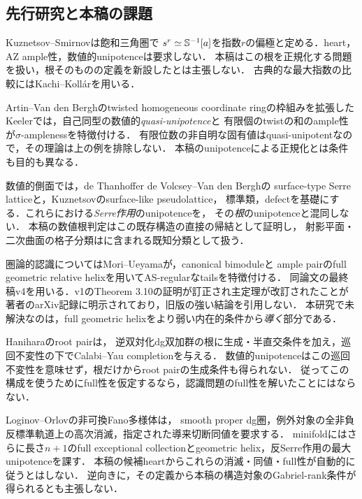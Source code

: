 \documentclass[11pt,a4paper]{ltjsarticle}
\begin{document}
\subsection{先行研究と本稿の課題}\label{subsec:literature}
Kuznetsov--Smirnov\cite[Definition 2.1, Example 2.2]{KS}は飽和三角圏で
$s^r\simeq\mathbb S^{-1}[a]$を指数$r$の偏極と定める．heart，AZ ample性，数値的unipotenceは要求しない．
本稿はこの根を正規化する問題を扱い，根そのものの定義を新設したとは主張しない．
古典的な最大指数の比較にはKachi--Koll\'ar\cite[Corollary 2(1)]{KK}を用いる．

Artin--Van den Berghのtwisted homogeneous coordinate ringの枠組みを拡張した
Keeler\cite[Theorems 1.2, 1.3]{Keeler}では，自己同型の数値的\emph{quasi-unipotence}と
有限個のtwistの和のample性が$\sigma$-amplenessを特徴付ける．
有限位数の非自明な固有値はquasi-unipotentなので，その理論は上の例を排除しない．
本稿のunipotenceによる正規化とは条件も目的も異なる．

数値的側面では，de Thanhoffer de Volcsey--Van den Bergh\cite[\S3.2--3.3]{dTVdB}の
surface-type Serre latticeと，Kuznetsov\cite[\S3, Definition 5.3]{Kuz}のsurface-like pseudolattice，
標準類，defectを基礎にする．これらにおける\emph{Serre作用}のunipotenceを，
その\emph{根}のunipotenceと混同しない．
本稿の数値根判定はこの既存構造の直接の帰結として証明し，
射影平面・二次曲面の格子分類は\cite[Theorem 5.12]{Kuz}に含まれる既知分類として扱う．

圏論的認識についてはMori--Ueyama\cite[Theorem 4.1]{MU}が，canonical bimoduleと
ample pairのfull geometric relative helixを用いてAS-regularなtailsを特徴付ける．
同論文の最終稿v4を用いる．v1のTheorem 3.10の証明が訂正され主定理が改訂されたことが
著者のarXiv記録に明示されており，旧版の強い結論を引用しない．
本研究で未解決なのは，full geometric helixをより弱い内在的条件から\emph{導く}部分である．

Hanihara\cite[Definition 2.5, Definitions 3.1--3.2, Theorem 3.3]{Hanihara}のroot pairは，
逆双対化dg双加群の根に生成・半直交条件を加え，巡回不変性の下でCalabi--Yau completionを与える．
数値的unipotenceはこの巡回不変性を意味せず，根だけからroot pairの生成条件も得られない．
従ってこの構成を使うためにfull性を仮定するなら，認識問題のfull性を解いたことにはならない．

Loginov--Orlov\cite[Definitions 2.1, 2.3, 2.6; Proposition 2.7]{LO}の非可換Fano多様体は，
smooth proper dg圏，例外対象の全非負反標準軌道上の高次消滅，指定された導来切断同値を要求する．
minifoldにはさらに長さ$n+1$のfull exceptional collectionとgeometric helix，反Serre作用の最大unipotenceを課す．
本稿の候補heartからこれらの消滅・同値・full性が自動的に従うとはしない．
逆向きに，その定義から本稿の構造対象のGabriel-rank条件が得られるとも主張しない．
\end{document}
